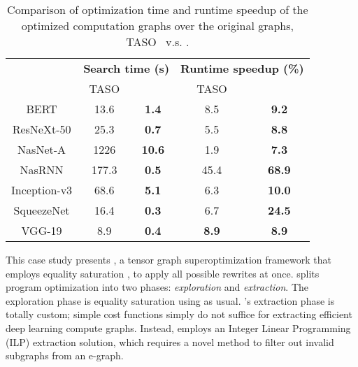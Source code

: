 \begin{table}[]
    \centering
    \begin{tabular}{ccc|cc}
    \hline
    & \multicolumn{2}{c|}{\bf Search time (s)} & \multicolumn{2}{c}{\bf Runtime speedup (\%)} \\
    & TASO & \ourname{} & TASO & \ourname{} \\
    \hline
    BERT & 13.6 & \textbf{1.4} & 8.5 & \textbf{9.2} \\
    ResNeXt-50 & 25.3 & \textbf{0.7} & 5.5 & \textbf{8.8} \\
    NasNet-A & 1226 & \textbf{10.6} & 1.9 & \textbf{7.3} \\
    NasRNN & 177.3 & \textbf{0.5} & 45.4 & \textbf{68.9} \\
    Inception-v3 & 68.6 & \textbf{5.1} & 6.3 & \textbf{10.0} \\
    SqueezeNet & 16.4 & \textbf{0.3} & 6.7 & \textbf{24.5} \\
    VGG-19 & 8.9 & \textbf{0.4} & \textbf{8.9} & \textbf{8.9} \\
    \hline
    \end{tabular}
    \caption{Comparison of optimization time and runtime speedup of the optimized computation graphs over the original graphs, TASO~\cite{taso} v.s. \ourname{}.}
    \label{table:ngraph}
\end{table}


This case study presents \ourname{}, a tensor graph superoptimization framework that employs equality saturation \cite{eqsat, eqsat-llvm, egg},
to apply all possible rewrites at once.  %
\tensat splits program optimization into two phases: {\em exploration} and {\em extraction}.
The exploration phase is equality saturation using \egg as usual.
\tensat's extraction phase is totally custom;
 simple cost functions simply do not suffice for extracting efficient deep learning compute graphs.
Instead, \tensat employs an Integer Linear Programming (ILP) extraction solution,
 which requires
 a novel method to filter out invalid subgraphs from an e-graph.


